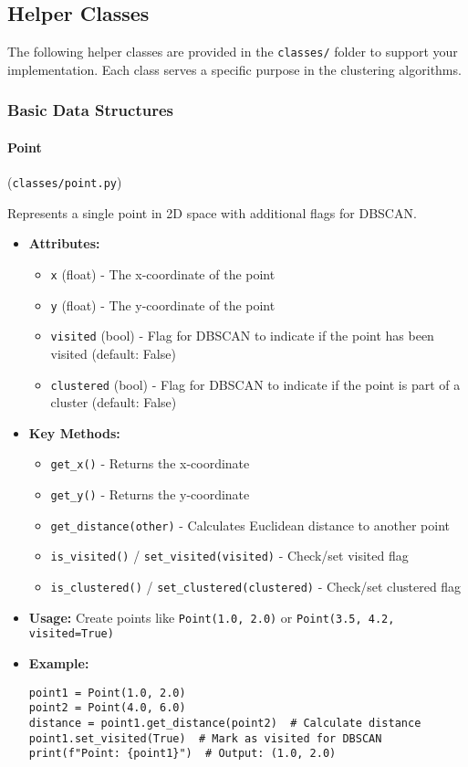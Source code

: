 \documentclass[
english,
smallborders
]{i6prcsht}
\begin{document}
\subsection*{Helper Classes}

The following helper classes are provided in the \texttt{classes/} folder to support your implementation. Each class serves a specific purpose in the clustering algorithms.

\vspace*{0.5cm}

\subsubsection*{Basic Data Structures}

\paragraph{Point} (\texttt{classes/point.py})

Represents a single point in 2D space with additional flags for DBSCAN.

\begin{itemize}
	\item \textbf{Attributes:}
	      \begin{itemize}
		      \item \texttt{x} (float) - The x-coordinate of the point
		      \item \texttt{y} (float) - The y-coordinate of the point
		      \item \texttt{visited} (bool) - Flag for DBSCAN to indicate if the point has been visited (default: False)
		      \item \texttt{clustered} (bool) - Flag for DBSCAN to indicate if the point is part of a cluster (default: False)
	      \end{itemize}
	\item \textbf{Key Methods:}
	      \begin{itemize}
		      \item \texttt{get\_x()} - Returns the x-coordinate
		      \item \texttt{get\_y()} - Returns the y-coordinate
		      \item \texttt{get\_distance(other)} - Calculates Euclidean distance to another point
		      \item \texttt{is\_visited()} / \texttt{set\_visited(visited)} - Check/set visited flag
		      \item \texttt{is\_clustered()} / \texttt{set\_clustered(clustered)} - Check/set clustered flag
	      \end{itemize}
	\item \textbf{Usage:} Create points like \texttt{Point(1.0, 2.0)} or \texttt{Point(3.5, 4.2, visited=True)}
	\item \textbf{Example:}
	      \begin{lstlisting}
point1 = Point(1.0, 2.0)
point2 = Point(4.0, 6.0)
distance = point1.get_distance(point2)  # Calculate distance
point1.set_visited(True)  # Mark as visited for DBSCAN
print(f"Point: {point1}")  # Output: (1.0, 2.0)
    \end{lstlisting}
\end{itemize}
\end{document}
